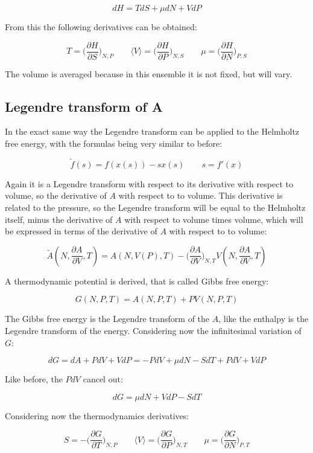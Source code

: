 	$$dH = TdS + \mu dN + VdP$$

	From this the following derivatives can be obtained:

	$$T = \biggl(\frac{\partial H}{\partial S}\biggr)_{N, P} \qquad \langle V\rangle = \biggl(\frac{\partial H}{\partial P}\biggr)_{N, S} \qquad \mu = \biggl(\frac{\partial H}{\partial N}\biggr)_{P, S}$$

	The volume is averaged because in this ensemble it is not fixed, but will vary.

	\subsection{Legendre transform of A}
	 In the exact same way the Legendre transform can be applied to the Helmholtz free energy, with the formulas being very similar to before:

	$$\tilde{f}(s) = f(x(s))-sx(s)\qquad s = f'(x)$$

	Again it is a Legendre transform with respect to its derivative with respect to volume, so the derivative of $A$ with respect to to volume.
	This derivative is related to the pressure, so the Legendre transform will be equal to the Helmholtz itself, minus the derivative of $A$ with respect to volume times volume, which will be expressed in terms of the derivative of $A$ with respect to to volume:

	$$\tilde{A}(N, \frac{\partial A}{\partial V}, T) = A(N, V(P), T)- \biggl(\frac{\partial A}{\partial V}\biggr)_{N, T}V(N, \frac{\partial A}{\partial V}, T)$$

	A thermodynamic potential is derived, that is called Gibbs free energy:

	$$G(N, P, T) = A(N, P, T) + PV(N, P, T)$$

	The Gibbs free energy is the Legendre transform of the $A$, like the enthalpy is the Legendre transform of the energy.
	Considering now the infinitesimal variation of $G$:

	$$dG = dA + PdV + VdP = -PdV + \mu dN - SdT + PdV + VdP$$

	Like before, the $PdV$ cancel out:

	$$dG = \mu dN + VdP - SdT$$

	Considering now the thermodynamics derivatives:

	$$S = -\biggl(\frac{\partial G}{\partial T}\biggr)_{N, P}\qquad\langle V\rangle = \biggl(\frac{\partial G}{\partial P}\biggr)_{N, T}\qquad \mu = \biggl(\frac{\partial G}{\partial N}\biggr)_{P, T}$$

